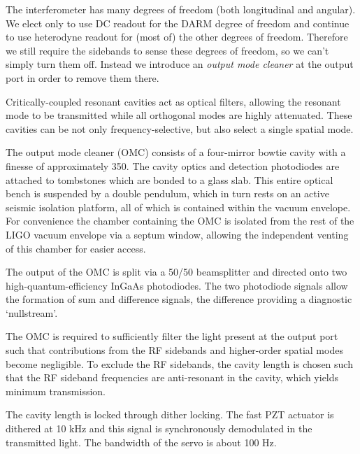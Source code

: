 \label{chapter4}
\doublespace
{}
The interferometer has many degrees of freedom (both longitudinal and
angular).  We elect only to use DC readout for the DARM degree of
freedom and continue to use heterodyne readout for (most of) the other
degrees of freedom.  Therefore we still require the sidebands to sense
these degrees of freedom, so we can't simply turn them off.  Instead
we introduce an \emph{output mode cleaner} at the output port in order
to remove them there.


Critically-coupled resonant cavities act as optical filters, allowing
the resonant mode to be transmitted while all orthogonal modes are
highly attenuated.  These cavities can be not only
frequency-selective, but also select a single spatial mode.


The output mode cleaner (OMC) consists of a four-mirror bowtie cavity
with a finesse of approximately 350. The cavity optics and detection
photodiodes are attached to tombstones which are bonded to a glass
slab. This entire optical bench is suspended by a double pendulum,
which in turn rests on an active seismic isolation platform, all of
which is contained within the vacuum envelope. For convenience the
chamber containing the OMC is isolated from the rest of the LIGO vacuum
envelope via a septum window, allowing the independent venting of
this chamber for easier access.

The output of the OMC is split via a 50/50 beamsplitter and directed
onto two high-quantum-efficiency InGaAs photodiodes. The two photodiode
signals allow the formation of sum and difference signals, the difference
providing a diagnostic `nullstream'.



The OMC is required to sufficiently filter the light present at the
output port such that contributions from the RF sidebands and higher-order
spatial modes become negligible. To exclude the RF sidebands, the
cavity length is chosen such that the RF sideband frequencies are
anti-resonant in the cavity, which yields minimum transmission.


The cavity length is locked through dither locking.  The fast PZT
actuator is dithered at 10 kHz and this signal is synchronously
demodulated in the transmitted light.  The bandwidth of the servo is
about 100 Hz.

